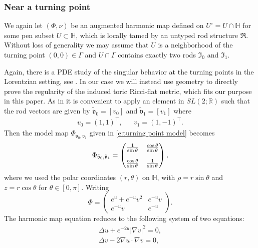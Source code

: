 \documentclass[a4paper,11pt]{amsart}
\theoremstyle{definition}
\numberwithin{equation}{section}
\newcommand{\dH}{\mathbb{H}}
\newcommand{\mv} {\mathfrak v}
\newcommand{\mR} {\mathfrak R}
\begin{document}
\subsubsection{Near a turning point} 
\label{subsubsec:local regularity near a turning point}




We again let $(\Phi, \nu)$ be an augmented harmonic map defined on  $U^\circ=U\cap \dH$ for some pen subset $U\subset \dH$,  which is locally tamed by an untyped rod structure $\mR$.  Without loss of generality we may assume that $U$ is a neighborhood of the turning point $(0,0)\in\Gamma$  and $U\cap\Gamma$ contains exactly two rods $\mathfrak I_0$ and $\mathfrak I_1$.
 
Again, there is a  PDE study of the singular behavior at the turning points  in the Lorentzian setting, see \cite{HKWX}. In our case we will instead use geometry to directly prove the regularity of the induced toric Ricci-flat metric, which fits our purpose in this paper.  As in \cite{HKWX} it is convenient to apply an element in $SL(2;\mathbb R)$ such that the rod vectors are given by $\tilde{\mathfrak{v}}_0=[v_0]$ and $\tilde{\mathfrak{v}}_1=[v_1]$ where  
\begin{align*}
    v_0=(1,1)^{\top}, && v_1=(1,-1)^{\top}.
\end{align*}
Then the model map $\Phi_{\mv_0, \mv_1}$ given in \eqref{e:turning point model} becomes 
\begin{equation}\label{eq:sin 1/sin}
\Phi_{\tilde{\mv}_0, \tilde{\mv}_1}=\left(\begin{matrix}
	\frac{1}{\sin\theta} &\frac{\cos\theta}{\sin\theta} \vspace{10pt}\\ \frac{\cos\theta}{\sin\theta}& \frac{1}{\sin\theta}
\end{matrix}\right), 
\end{equation} 
where we used the  polar coordinates $(r, \theta)$ on $\dH$, with $\rho=r\sin\theta$ and $z=r\cos\theta$ for $\theta\in[0,\pi]$.
Writing 
$$\Phi=\left(\begin{matrix}e^u+e^{-u}v^2&e^{-u}v\\e^{-u}v&e^{-u} \end{matrix}\right).$$
The harmonic map equation reduces to the following system of two equations:
\begin{align}
	\Delta u+e^{-2u}|\nabla v|^2=0,\label{eq:harmonic u}\\
	\Delta v-2\nabla u\cdot\nabla v=0,\label{eq:harmonic v}
\end{align}
\end{document}
